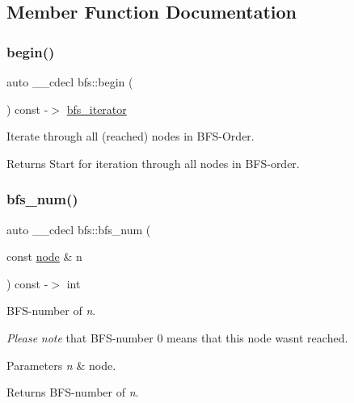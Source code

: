 \subsection{Member Function Documentation}
\mbox{\label{classbfs_a350eb3e4fcfea5c9c9cd18f54a722289}} 
\subsubsection{\texorpdfstring{begin()}{begin()}}
{\footnotesize\ttfamily auto \+\_\+\+\_\+cdecl bfs\+::begin (\begin{DoxyParamCaption}{ }\end{DoxyParamCaption}) const -\/$>$ \mbox{\hyperlink{classbfs_acafce54954100cc7bc9f80eb318a7bee}{bfs\+\_\+iterator}}
	\hspace{0.3cm}{\ttfamily [inline]}}



Iterate through all (reached) nodes in B\+F\+S-\/\+Order. 

\begin{DoxyReturn}{Returns}
Start for iteration through all nodes in B\+F\+S-\/order. 
\end{DoxyReturn}
\mbox{\label{classbfs_aa7e557aefbff0b1308462d9b31ae3de1}} 
\subsubsection{\texorpdfstring{bfs\+\_\+num()}{bfs\_num()}}
{\footnotesize\ttfamily auto \+\_\+\+\_\+cdecl bfs\+::bfs\+\_\+num (\begin{DoxyParamCaption}\item[{const \mbox{\hyperlink{classnode}{node}} \&}]{n }\end{DoxyParamCaption}) const -\/$>$ int
	\hspace{0.3cm}{\ttfamily [inline]}}



B\+F\+S-\/number of {\itshape n}. 

{\itshape Please} {\itshape note} that B\+F\+S-\/number 0 means that this node wasn\textquotesingle{}t reached.


\begin{DoxyParams}{Parameters}
{\em n} & node. \\
\hline
\end{DoxyParams}
\begin{DoxyReturn}{Returns}
B\+F\+S-\/number of {\itshape n}. 
\end{DoxyReturn}
\mbox{\label{classbfs_aa02df0b00c5fbaa29b9a41a211732e0f}} 
